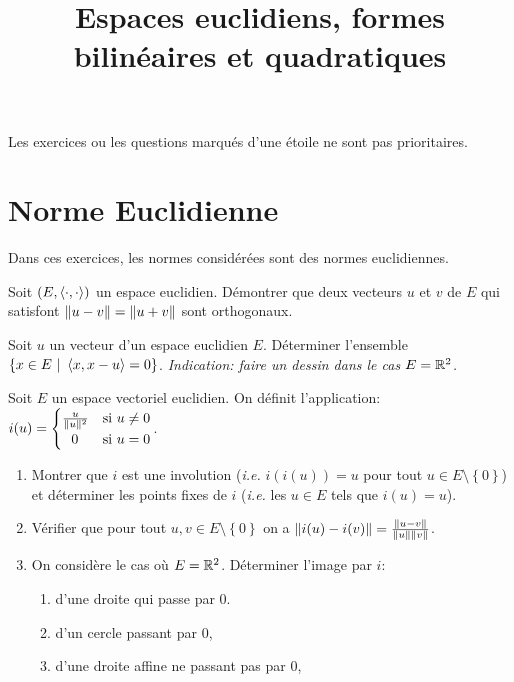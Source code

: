 \documentclass{tp_um}
\title{\Large \sffamily\bfseries Espaces euclidiens,  formes bilinéaires et quadratiques}
\begin{document}
\maketitle

\bigskip

Les exercices ou les questions marqués d'une étoile ne sont pas prioritaires.


\section{Norme Euclidienne}

Dans ces exercices, les normes considérées sont des normes euclidiennes.


\exo{} Soit $(E,\left\langle \cdot,\cdot\right\rangle)$ un espace euclidien.  Démontrer que deux vecteurs $u$ et $v$ de $E$ qui satisfont $\left\lVert u-v\right\rVert = \left\lVert u+v\right\rVert$ sont orthogonaux.

\newpage

\exo{} Soit $u$ un vecteur d'un espace euclidien $E$. Déterminer l'ensemble $\{ x \in E\  | \  \left\langle x,x-u\right\rangle =0  \}$.
 {\it Indication: faire un dessin dans le cas $E=\mathbb{R}^2$. }

\newpage

 Soit $E$ un espace vectoriel euclidien. On définit l'application: $ i(u) = \begin{cases} \frac{u}{\lVert u\rVert^2} & \text{si $u\neq 0$} \\ \  \   0 & \text{si $u=0$} \end{cases}$.
\begin{enumerate}
	\item Montrer que $i$ est une involution ({\it i.e. } $i(i(u)) = u$ pour tout $u\in E \setminus \left\{ 0 \right\}$) et déterminer les points fixes de $i$ ({\it i.e. } les $u\in E$ tels que $i(u) = u$).
	\item Vérifier que pour tout $u,v \in E \setminus \left\{ 0 \right\}$ on a $\left\lVert i(u) - i(v)\right\rVert = \frac{\left\lVert u-v\right\rVert}{\left\lVert u\right\rVert\left\lVert v\right\rVert}$.
	\item On considère le cas où $E=\mathbb{R}^2$. Déterminer l'image par $i$:
		\begin{enumerate}
			\item d'une droite qui passe par $0$.
			\item d'un cercle passant par $0$,
			\item d'une droite affine ne passant pas par $0$,
		\end{enumerate}
\end{enumerate}
\end{document}
